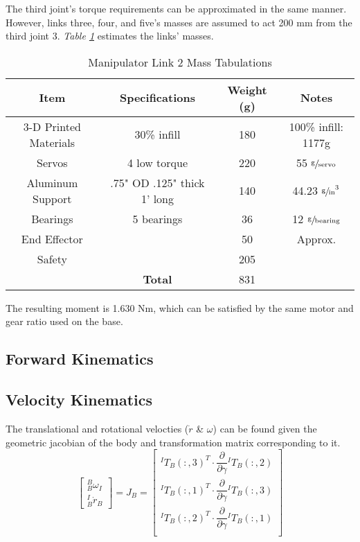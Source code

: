 The third joint’s torque requirements can be approximated in the same manner. However, links three, four, and five’s masses are assumed to act 200 mm from the third joint 3. \emph{Table \ref{tab:arm2}} estimates the links’ masses.

\begin{table}[htp]
  \center
  \caption{Manipulator Link 2 Mass Tabulations}
  \label{tab:arm2}
\begin{tabular}{cc|cc}
\textbf{Item} & \textbf{Specifications} & \textbf{Weight (g)} & \textbf{Notes} \\\hline
3-D Printed Materials & 30\% infill & 180 & 100\% infill: 1177g \\
Servos & 4 low torque & 220 & 55 $\sfrac{\text{g}}{\text{servo}}$ \\
Aluminum Support & .75" OD .125" thick 1' long & 140 & 44.23 $\sfrac{\text{g}}{\text{in}}^3$ \\
Bearings & 5 bearings & 36 & 12 $\sfrac{\text{g}}{\text{bearing}}$ \\
End Effector & & 50 & Approx. \\
Safety & & 205 & \\
& \textbf{Total} & 831 & \\
\end{tabular}
\end{table}

The resulting moment is 1.630 Nm, which can be satisfied by the same motor and gear ratio used on the base.
\newpage
\subsection{Forward Kinematics}

\newpage
\subsection{Velocity Kinematics}
The translational and rotational velocties ($\dot{r}$ \& $\omega$) can be found given the geometric jacobian of the body and transformation matrix corresponding to it.
\[
\begin{bmatrix}
  ^B_B\omega_I\\
  ^I_B\dot{r}_B
\end{bmatrix}
= J_B =
\begin{bmatrix}
  ^IT_B(:,3)^T \cdot \dfrac{\partial}{\partial\gamma}{}^IT_B(:,2) \\
  ^IT_B(:,1)^T \cdot \dfrac{\partial}{\partial\gamma}{}^IT_B(:,3) \\
  ^IT_B(:,2)^T \cdot \dfrac{\partial}{\partial\gamma}{}^IT_B(:,1) \\
\end{bmatrix}
\]



